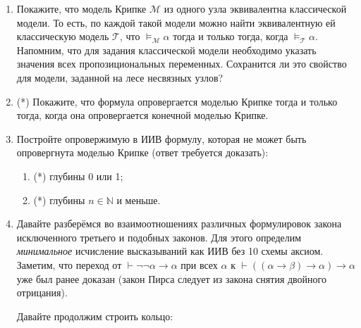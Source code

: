 \documentclass[10pt,a4paper,oneside]{article}
\begin{document}
\begin{enumerate}
\item Покажите, что модель Крипке $\mathcal{M}$ из одного узла эквивалентна классической модели.
То есть, по каждой такой модели можно найти эквивалентную ей классическую модель $\mathcal{T}$, что $\models_\mathcal{M}\alpha$ 
тогда и только тогда, когда $\models_\mathcal{T}\alpha$. Напомним, что для задания классической модели
необходимо указать значения всех пропозициональных переменных. Сохранится ли это свойство для модели,
заданной на лесе несвязных узлов?

\item (*) Покажите, что формула опровергается моделью Крипке тогда и только тогда, когда она опровергается конечной моделью Крипке.

\item Постройте опровержимую в ИИВ формулу, которая не может быть опровергнута моделью Крипке (ответ требуется доказать):
\begin{enumerate}
\item (*) глубины 0 или 1;
\item (*) глубины $n \in \mathbb{N}$ и меньше.
\end{enumerate}


\item Давайте разберёмся во взаимоотношениях различных формулировок закона исключенного третьего и подобных
законов. Для этого определим \emph{минимальное} исчисление высказываний как ИИВ без 10 схемы аксиом.
Заметим, что переход от $\vdash\neg\neg\alpha\rightarrow\alpha$ при всех $\alpha$ к
$\vdash((\alpha\rightarrow\beta)\rightarrow\alpha)\rightarrow\alpha$ уже был ранее доказан 
(закон Пирса следует из закона снятия двойного отрицания).

Давайте продолжим строить кольцо:

\begin{center}\end{center}


\end{enumerate}
\end{document}
